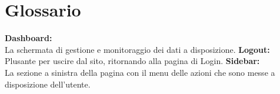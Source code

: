 \section{Glossario}
\textbf{Dashboard:}\\La schermata di gestione e monitoraggio dei dati a disposizione.
\textbf{Logout:}\\Plusante per uscire dal sito, ritornando alla pagina di Login. 
\textbf{Sidebar:}\\ La sezione a sinistra della pagina con il menu delle azioni che sono messe a disposizione dell'utente.